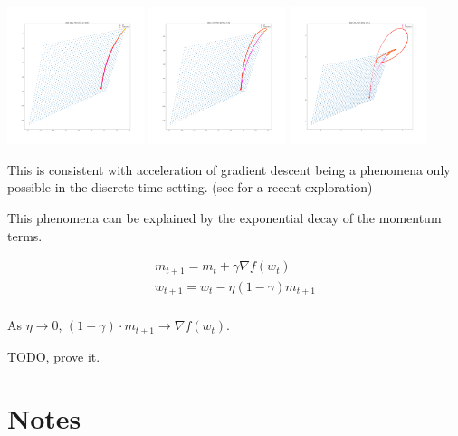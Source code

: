 \includegraphics[width=0.3\textwidth,height=0.25\textheight]{../../pictures/figures/vi_sgd-vs-vi_mom_0001.png}
\includegraphics[width=0.3\textwidth,height=0.25\textheight]{../../pictures/figures/vi_sgd-vs-vi_mom_001.png}
\includegraphics[width=0.3\textwidth,height=0.25\textheight]{../../pictures/figures/vi_sgd-vs-vi_mom_01.png}

This is consistent with acceleration of gradient descent being a phenomena only possible in the discrete time setting. (see \cite{Betancourt2018} for a recent exploration)

This phenomena can be explained by the exponential decay of the momentum terms.

\begin{align}
m_{t+1} = m_t + \gamma\nabla f(w_t) \\
w_{t+1} = w_t - \eta (1-\gamma) m_{t+1} \\
\end{align}

As \(\eta \to 0\), \((1-\gamma) \cdot m_{t+1} \to \nabla f(w_t)\).

TODO, prove it.

\section{Notes}

